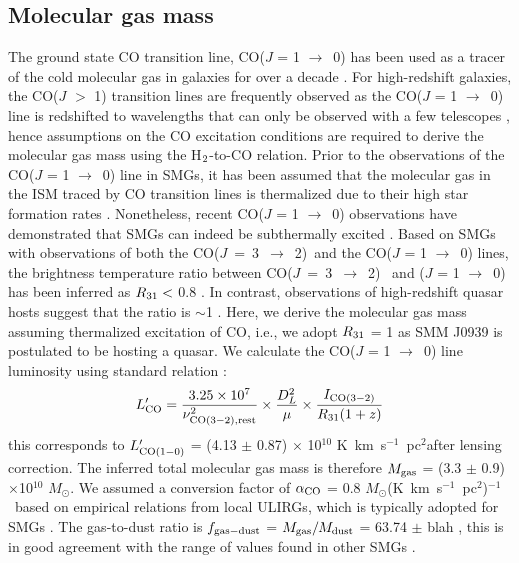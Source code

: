 \documentclass[twocolumn,apj,numberedappendix]{emulateapj}
\newcommand{\Msun}{\mbox{$M_{\odot}$}}
\newcommand{\rarr}{$\rightarrow$}
\newcommand{\CO}{\mbox{CO($J$ = 3 $\rightarrow$ 2) }}
\newcommand{\LpU}{\mbox{K km s$^{-1}$ pc$^2$}}
\newcommand{\eg}{{\sl e.g.,~}}
\newcommand{\pmOne}{$^{-1}$}
\begin{document}
\subsection{Molecular gas mass}
The ground state CO transition line, CO($J$ = 1 \rarr\ 0) has been used as a tracer of the cold molecular gas in galaxies for 
over a decade \citep*[\eg][]{Downes98a}. For high-redshift galaxies, the CO($J$ $>$ 1) transition lines are frequently observed as
 the CO($J$ = 1 \rarr\ 0) line is redshifted to wavelengths that can only be observed with a few telescopes \citep{Carilli13a}, 
 hence assumptions on the CO excitation conditions are required to derive the molecular gas mass using the H$_{\rm 2}$-to-CO 
 relation. Prior to the observations of the CO($J$ = 1 \rarr\ 0) line in SMGs, it has been assumed that the molecular gas in the
  ISM traced by CO transition lines is thermalized due to their high star formation rates \citep[\eg][]{Greve05a, Coppin08a}.
   Nonetheless, recent CO($J$ = 1 \rarr\ 0) observations have demonstrated that SMGs can indeed be subthermally excited
   \citep{Bothwell13a, Harris10a}. Based on SMGs with observations of both the \CO and the CO($J$ = 1 \rarr\ 0) lines, the 
   brightness temperature ratio between \CO
and ($J$ = 1 \rarr\ 0) has been inferred as $R_{\rm 31}<$ 0.8 \citep
   {Harris10a,Carilli10a,Swinbank2010a,Ivison11a,Ivison10d}. In contrast, observations of high-redshift quasar hosts suggest that the ratio 
   is $\sim$1 \citep{Riechers06a, Riechers11a, Scott11a}. 
Here, we derive the molecular gas mass assuming thermalized excitation of CO, i.e., we adopt $R_{\rm 31}$ = 1 as SMM J0939 is 
postulated to be hosting a quasar. We calculate the CO($J$ = 1 \rarr\ 0) line luminosity using standard relation 
\citep[\eg][]{Solomon05a,Carilli13a}:
\begin{equation}
L^{\prime}_{\rm CO} = \frac{3.25\times10^7}{\nu_{\rm CO (3-2), rest}^2}\times \frac{D_L^2}{\mu} \times
\frac{I_{\rm CO(3-2)}} {R_{\rm 31} (1 + z)}
\end{equation}
this corresponds to $L^{\prime}_{\rm CO (1-0)}$ = (4.13 $\pm$ 0.87) $\times$ 10$^{10}$ \LpU after lensing correction. The inferred total molecular gas mass is therefore $M_{\rm gas}$ = (3.3 $\pm$ 0.9) $\times
$10$^{10}$ \Msun. We assumed a conversion factor of $\alpha_{\rm CO}$ =
0.8 \Msun (\LpU)\pmOne\ based on empirical relations from local ULIRGs, which is typically
adopted for SMGs \citep[\eg][]{Bothwell13a,Tacconi10a,Daddi2010a}. 
The gas-to-dust
ratio is $f_{\rm gas-dust}$ = $M_{\rm gas}/M_{\rm dust}$ = 63.74 $\pm$ blah , this is in good agreement with the range 
of values found in other SMGs \citep{Coppin08a}.
\end{document}
